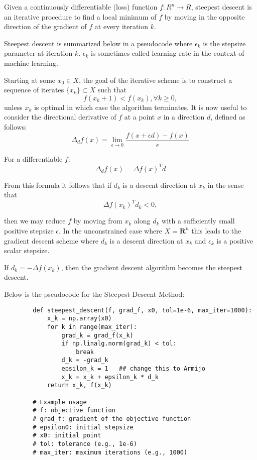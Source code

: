 \documentclass{article} %
\theoremstyle{definition}
\theoremstyle{remark}
\theoremstyle{plain}
\begin{document}
    Given a continuously differentiable (loss) function \(f : R^n \to R \), steepest descent is an iterative procedure to find a local minimum of \(f\) by moving in the opposite direction of the gradient of \(f\) at every iteration \(k\).

    Steepest descent is summarized below in a pseudocode where \(\epsilon_k\) is the stepsize parameter at iteration \(k\). \(\epsilon_k\) is sometimes called learning rate
    in the context of machine learning. 
    
    Starting at some \(x_0 \in X\), the goal of the iterative scheme is to construct a sequence of iterates \(\{ x_k \} \subset X\) such that
    \[f(x_k+1) < f(x_k), \forall k \geq 0,\]
    unless \(x_k\) is optimal in which case the algorithm terminates. It is now useful to consider the directional derivative of \(f\) at a point \(x\) in a direction \(d\), defined as follows:
    \[\Delta_d f(x) = \lim_{\epsilon \to 0} \frac{f(x + \epsilon d) - f(x)}{\epsilon }\]

    For a differentiable \(f\):
    \[\Delta_d f(x) = \Delta f(x)^T d\]

    From this formula it follows that if \(d_k\) is a descent direction at \(x_k\) in the sense that
    \[\Delta f(x_k)^T d_k < 0,\]

    then we may reduce \(f\) by moving from \(x_k\) along \(d_k\) with a sufficiently small positive stepsize \(\epsilon\). In the unconstrained case where \(X = \mathbf{R}^n\)
    this leads to the gradient descent scheme where \(d_k\) is a descent direction at \(x_k\) and \(\epsilon_k\) is a positive scalar stepsize.
    
    If \(d_k = -\Delta f(x_k)\), then the gradient descent algorithm becomes the steepest descent.

    Below is the pseudocode for the Steepest Descent Method:
    \begin{verbatim}
        def steepest_descent(f, grad_f, x0, tol=1e-6, max_iter=1000):
            x_k = np.array(x0)
            for k in range(max_iter):
                grad_k = grad_f(x_k)
                if np.linalg.norm(grad_k) < tol:
                    break
                d_k = -grad_k
                epsilon_k = 1   ## change this to Armijo
                x_k = x_k + epsilon_k * d_k
            return x_k, f(x_k)

        # Example usage
        # f: objective function
        # grad_f: gradient of the objective function
        # epsilon0: initial stepsize
        # x0: initial point
        # tol: tolerance (e.g., 1e-6)
        # max_iter: maximum iterations (e.g., 1000)
    \end{verbatim}
\end{document}
